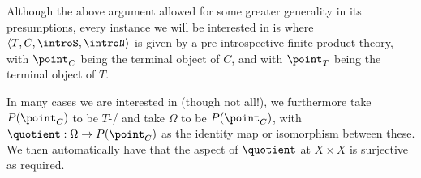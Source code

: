 \begin{corollary}\label{PreIntrospDiagSpecialization}
Although the above argument allowed for some greater generality in its presumptions, every instance we will be interested in is where $\langle T, C, \introS, \introN \rangle$ is given by a pre-introspective finite product theory, with $\point_C$ being the terminal object of $C$, and with $\point_T$ being the terminal object of $T$.

In many cases we are interested in (though not all!), we furthermore take $P(\point_C)$ to be $T$-\repsmall/ and take $\Omega$ to be $P(\point_C)$, with $\quotient : \Omega \to P(\point_C)$ as the identity map or isomorphism between these. We then automatically have that the aspect of $\quotient$ at ${X \times X}$ is surjective as required.
\end{corollary}

